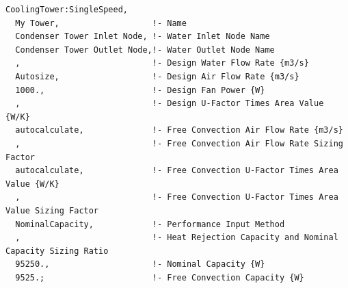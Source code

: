 \begin{lstlisting}
CoolingTower:SingleSpeed,
  My Tower,                   !- Name
  Condenser Tower Inlet Node, !- Water Inlet Node Name
  Condenser Tower Outlet Node,!- Water Outlet Node Name
  ,                           !- Design Water Flow Rate {m3/s}
  Autosize,                   !- Design Air Flow Rate {m3/s}
  1000.,                      !- Design Fan Power {W}
  ,                           !- Design U-Factor Times Area Value {W/K}
  autocalculate,              !- Free Convection Air Flow Rate {m3/s}
  ,                           !- Free Convection Air Flow Rate Sizing Factor
  autocalculate,              !- Free Convection U-Factor Times Area Value {W/K}
  ,                           !- Free Convection U-Factor Times Area Value Sizing Factor
  NominalCapacity,            !- Performance Input Method
  ,                           !- Heat Rejection Capacity and Nominal Capacity Sizing Ratio
  95250.,                     !- Nominal Capacity {W}
  9525.;                      !- Free Convection Capacity {W}


\end{lstlisting}

